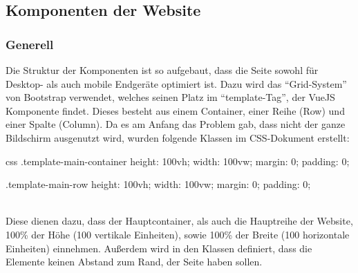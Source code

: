 \newpage
\subsection{Komponenten der Website}
\label{chapter:implementierung-frontend-komponenten}
\subsubsection{Generell}
\label{chapter:implementierung-frontend-komponenten-generell}
Die Struktur der Komponenten ist so aufgebaut, dass die Seite sowohl für Desktop- als auch mobile Endgeräte optimiert ist. Dazu wird das \enquote{Grid-System} von Bootstrap verwendet, welches seinen Platz im \enquote{template-Tag}, der VueJS Komponente findet. Dieses besteht aus einem Container, einer Reihe (Row) und einer Spalte (Column). Da es am Anfang das Problem gab, dass nicht der ganze Bildschirm ausgenutzt wird, wurden folgende Klassen im CSS-Dokument erstellt:
\begin{code}{css}
	.template-main-container {
		height: 100vh;
		width: 100vw;
		margin: 0;
		padding: 0;
	}
	
	.template-main-row {
		height: 100vh;
		width: 100vw;
		margin: 0;
		padding: 0;
	}
\end{code}
	\label{list:cssmaincont} ~\\
Diese dienen dazu, dass der Hauptcontainer, als auch die Hauptreihe der Website, 100\% der Höhe (100 vertikale Einheiten), sowie 100\% der Breite (100 horizontale Einheiten) einnehmen. Außerdem wird in den Klassen definiert, dass die Elemente keinen Abstand zum Rand, der Seite haben sollen.
\newpage
